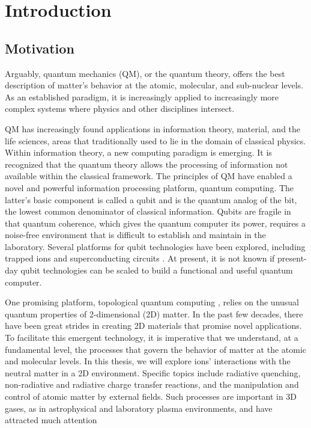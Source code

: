 \selectfont
\setcounter{chapter}{0}
\chapter{Introduction}

\label{introduction}
 
\section{Motivation}
Arguably, quantum mechanics (QM), or the quantum theory, offers the best description of matter's behavior at the atomic, molecular, and sub-nuclear levels. As an established paradigm, it is increasingly applied to increasingly more complex systems where physics and other disciplines intersect.

QM has increasingly found applications in information theory, material, and the life sciences, areas that traditionally used to lie in the domain of classical physics. Within information theory, a new computing paradigm is emerging. It is recognized that the quantum theory allows the processing of information \cite{QIP} not available within the classical framework.
The principles of QM have enabled a novel and powerful information processing platform, quantum computing. The latter's basic component is called a qubit \cite{qubits} and is the quantum analog of the bit, the lowest common denominator of classical information. Qubits are fragile in that quantum coherence, which gives the quantum computer its power, requires a noise-free environment that is difficult to establish and maintain in the laboratory. Several platforms for qubit technologies have been explored, including trapped ions and superconducting circuits \cite{qubits2}. At present, it is not known if present-day qubit technologies can be scaled to build a functional and useful quantum computer.

One promising platform, topological quantum computing \cite{Tqc1,Tqc2,Tqc3, Tqc4, Tqc5}, relies on the unusual quantum properties of 2-dimensional (2D) matter. In the past few decades, there have been great strides in creating 2D materials that promise novel applications.\cite{Nature2D}
To facilitate this emergent technology, it is imperative that we understand, at a fundamental level, the processes that govern the behavior of matter at the atomic and molecular levels. In this thesis, we will explore ions' interactions with the neutral matter in a 2D environment. Specific topics include radiative quenching, non-radiative and radiative charge transfer reactions, and the manipulation and control of atomic matter by external fields. Such processes are important in 3D gases,
as in astrophysical and laboratory plasma environments, and have attracted much attention \cite{plasma}

